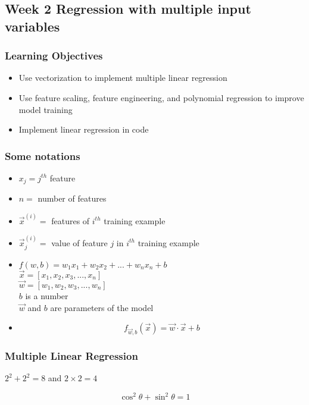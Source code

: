 \documentclass{article}
\begin{document}
    \subsection{Week 2 Regression with multiple input variables}
    \subsubsection{Learning Objectives}
    \begin{itemize}
        \item Use vectorization to implement multiple linear regression
        \item Use feature scaling, feature engineering, and polynomial regression to improve model training
        \item Implement linear regression in code
    \end{itemize}
    \subsubsection*{Some notations}
    \begin{itemize}
	    \item $x_j = j^{th}$ feature
        \item $n = $ number of features
        \item $\vec{x}^{(i)}=$ features of $i^{th}$ training example
        \item $\vec{x}^{(i)}_j=$ value of feature $j$ in $i^{th}$ training example
        \item $f(w,b)=w_1x_1+w_2x_2+...+w_nx_n+b$ \\ 
        $\vec{x}=[x_1,x_2,x_3,...,x_n]$ \\
        $\vec{w}=[w_1,w_2,w_3,...,w_n]$ \\
        $b$ is a number \\
        $\vec{w}$ and $b$ are parameters of the model
        \item $$f_{\vec{w},b}(\vec{x})=\vec{w}\cdot\vec{x}+b$$
    \end{itemize} 
    \subsubsection{Multiple Linear Regression}





    \newpage
    $ 2^{2} + 2^{2} = 8$ and $ 2 \times 2 = 4$

    \[ \cos^2 \theta + \sin^2 \theta = 1\]
    
\end{document}
